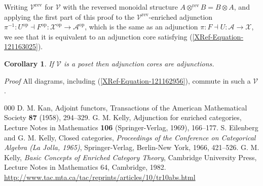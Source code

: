 \documentclass{amsart}
\newtheorem{corollary}[theorem]{Corollary}
\theoremstyle{definition}
\theoremstyle{remark}
\numberwithin{equation}{section}
\begin{document}
Writing $\mathcal{V}^{\mathrm{rev}}$ for $\mathcal{V}$ with the
reversed monoidal structure $A\otimes ^{\mathrm{rev}}B=B\otimes
A$, and applying the first part of this proof to the $\mathcal{V}^{\mathrm{rev}}$-enriched
adjunction $\pi ^{-1}:U^{\mathrm{op}}\dashv F^{\mathrm{op}}:\mathcal{X}^{\mathrm{op}}\longrightarrow
\mathcal{A}^{\mathrm{op}}$, which is the same as an adjunction $\pi
:F\dashv U:\mathcal{A}\longrightarrow \mathcal{X}$, we see that
it is equivalent to an adjunction core satisfying (\ref{XRef-Equation-121163025}).\ \ 

\begin{corollary}

If $\mathcal{V}$ is a poset then adjunction cores are adjunctions.
\end{corollary}

{\itshape Proof} All diagrams, including (\ref{XRef-Equation-121162956}),
commute in such a $\mathcal{V}$.\ \ 

\appendix
\begin{thebibliography}{000}
 D. M. Kan, Adjoint functors, Transactions of
the American Mathematical Society \textbf{87} (1958), 294--329.\label{KanAdjFun}
 G. M. Kelly, Adjunction for enriched categories,
Lecture Notes in Mathematics \textbf{106} (Springer-Verlag, 1969),
166--177.\label{Kelly1969}
 S. Eilenberg and G. M. Kelly, Closed categories,
\textit{Proceedings of the Conference on Categorical Algebra (La
Jolla, 1965)}, Springer-Verlag, Berlin-New York, 1966, 421--526.\label{EilKel1966}
 G. M. Kelly, \textit{Basic Concepts of Enriched
Category Theory}, Cambridge University Press, Lecture Notes in Mathematics
64, Cambridge, 1982. \href{http://www.tac.mta.ca/tac/reprints/articles/10/tr10abs.html}{http://www.tac.mta.ca/tac/reprints/articles/10/tr10abs.html}
\label{KellyBook}
\end{thebibliography}
\end{document}
